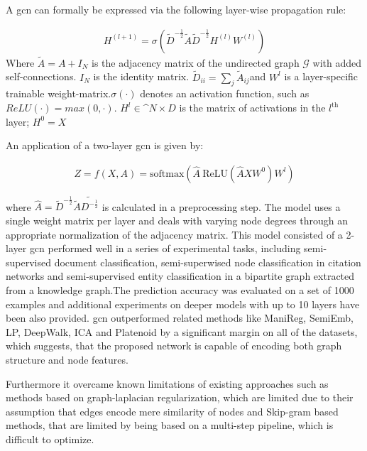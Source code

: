 A \acf{gcn} can formally be expressed via the following layer-wise propagation rule:

\begin{align*}
    H^{(l+1)} = \sigma (\tilde{D}^{-\frac{1}{2}}\tilde{A}\tilde{D}^{-\frac{1}{2}} H^{(l)}W^{(l)})
\end{align*}
Where $\tilde{A} = A + I_{N}$ is the adjacency matrix of the undirected graph $\mathcal{G}$
with added self-connections. $I_{N}$ is the identity matrix. $\tilde{D}_{ii} = \sum_{j}\tilde{A}_{ij}$and
$W^{l}$ is a layer-specific trainable weight-matrix.$\sigma(\cdot)$ denotes an activation function, such
as $ReLU(\cdot) = max(0, \cdot)$. $ H^{l}\in  \mathbb^{N \times D}$ is the matrix of activations in the
$l^{\mathrm{th}}$ layer; $H^{0}= X$

An application of a two-layer \ac{gcn} is given by:

\begin{align*}
    Z = f(X,A) = \mathrm{softmax} (\hat{A}\ \mathrm{ReLU}(\hat{A}XW^{0})W^{l})
\end{align*}

where $\hat{A} = \tilde{D}^{-\frac{1}{2}}\tilde{A}\tilde{D^{-\frac{1}{2}}}$
is calculated in a preprocessing step. The model uses a single weight matrix per layer and
deals with varying node degrees through an appropriate normalization of the adjacency matrix.
This model consisted of a 2-layer \ac{gcn} performed well in a series of experimental tasks,
including semi-supervised document classification, semi-superwised node classification in citation
networks and semi-supervised entity classification in a bipartite graph extracted from a knowledge
graph.The prediction accuracy was evaluated on a set of 1000 examples and additional experiments on
deeper models with up to 10 layers have been also provided. \ac{gcn} outperformed related methods
like ManiReg, SemiEmb, LP, DeepWalk, ICA and Platenoid by a significant margin on all of the datasets, which suggests, that the proposed
network is capable of encoding both graph structure and node features.

Furthermore it overcame known limitations of existing approaches such as methods based on
graph-laplacian regularization, which are limited due to their assumption that edges encode
mere similarity of nodes and Skip-gram based methods, that are limited by being based on a
multi-step pipeline, which is difficult to optimize.

